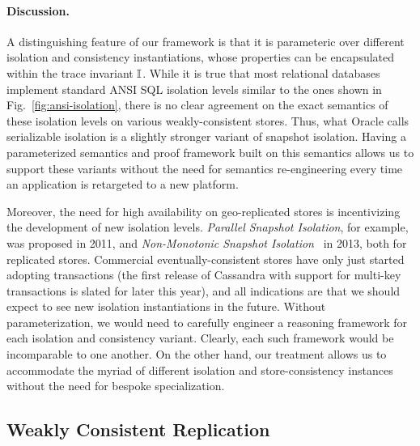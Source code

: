 
\paragraph{Discussion.} A distinguishing feature of our framework is that it
    is parameteric over different isolation and consistency
    instantiations, whose properties can be encapsulated within the
    trace invariant $\mathbb{I}$.  While it is true that most relational
    databases implement standard ANSI SQL isolation levels similar to
    the ones shown in Fig.~\ref{fig:ansi-isolation}, there is no clear
    agreement on the exact semantics of these isolation levels on
    various weakly-consistent stores.  Thus, what Oracle calls
    serializable isolation is a slightly stronger variant of snapshot
    isolation.  Having a parameterized semantics and proof framework
    built on this semantics allows us to support these variants
    without the need for semantics re-engineering every time an
    application is retargeted to a new platform.

    Moreover, the need for high availability on geo-replicated stores
    is incentivizing the development of new isolation
    levels. \emph{Parallel Snapshot Isolation}, for example, was
    proposed in 2011, and \emph{Non-Monotonic Snapshot
      Isolation}~\cite{...} in 2013, both for replicated
    stores. Commercial eventually-consistent stores have only just
    started adopting transactions (the first release of Cassandra with
    support for multi-key transactions is slated for later this year),
    and all indications are that we should expect to see new isolation
    instantiations in the future.  Without parameterization, we would
    need to carefully engineer a reasoning framework for each
    isolation and consistency variant.  Clearly, each such framework
    would be incomparable to one another. On the other hand, our
    treatment allows us to accommodate the myriad of different
    isolation and store-consistency instances without the need for
    bespoke specialization.



    
\subsection{Weakly Consistent Replication}
\label{sec:replication}

